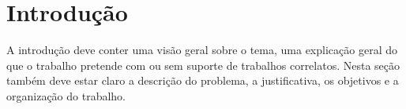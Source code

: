 \section{Introdução}

 A introdução deve conter uma visão geral sobre o tema, uma explicação geral do que o trabalho pretende com ou sem suporte de trabalhos correlatos. Nesta seção também deve estar claro a descrição do problema, a justificativa, os objetivos e a organização do trabalho.
 
 \lipsum[2-3]